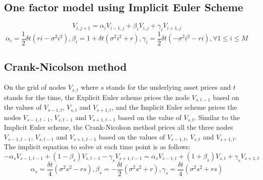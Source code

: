\subsection*{One factor model using Implicit Euler Scheme}
$$V_{i, j+1} = \alpha_{i}V_{i-1,j} + \beta_{i}V_{i,j} + \gamma_{i}V_{i+1,j}$$
$$\alpha_{i} = \frac{1}{2}\delta t(ri-\sigma^{2}i^{2}), \beta_{i} = 1+\delta t(\sigma^{2}i^{2} + r), \gamma_{i} = \frac{1}{2}\delta t(-\sigma^{2}i^{2} - ri), \forall 1 \le i \le M$$

\subsection*{Crank-Nicolson method}
On the grid of nodes $V_{s,t}$ where $s$ stands for the underlying asset prices and $t$ stands for the time, the Explicit Euler scheme prices the node $V_{s,t-1}$ based on the values of $V_{s-1,t}$, $V_{s,t}$ and $V_{s+1,t}$, and the Implicit Euler scheme prices the nodes $V_{s-1,t-1}$, $V_{s,t-1}$ and $V_{s+1,t-1}$ based on the value of $V_{s,t}$. Similar to the Implicit Euler scheme, the Crank-Nicolson method prices all the three nodes $V_{s-1,t-1}$, $V_{s,t-1}$ and $V_{s+1,t-1}$ based on the values of $V_{s-1,t}$, $V_{s,t}$ and $V_{s+1,t}$.\\
The implicit equation to solve at each time point is as follows:
$$-\alpha_{s}V_{s-1,t-1} + (1-\beta_{s})V_{s,t-1} - \gamma_{s}V_{s+1,t-1} = \alpha_{s}V_{s-1,t} + (1+\beta_{s})V_{s,t} + \gamma_{s}V_{s+1,t}$$
$$\alpha_{s} = \frac{\delta t}{4}(\sigma^{2}s^{2} - rs), \beta_{s} = -\frac{\delta t}{2}(\sigma^{2}s^{2} + r), \gamma_{s} = \frac{\delta t}{4}(\sigma^{2}s^{2} + rs)$$

